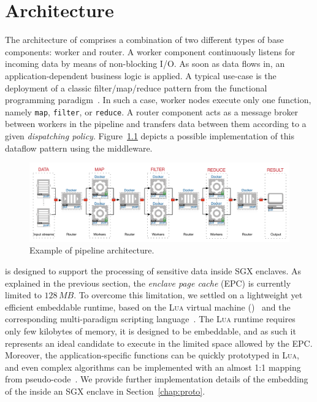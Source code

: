
\chapter{\SS{} Architecture}
\label{chap:arch}

The architecture of \SS{} comprises a combination of two different types of base components: \textsf{worker} and \textsf{router}.
A \textsf{worker} component continuously listens for incoming data by means of non-blocking I/O.
As soon as data flows in, an application-dependent business logic is applied.
A typical use-case is the deployment of a classic filter/map/reduce pattern from the functional programming paradigm~\cite{bird_introduction_1988}.
In such a case, worker nodes execute only one function, namely \texttt{map}, \texttt{filter}, or \texttt{reduce}.
A \textsf{router} component acts as a message broker between workers in the pipeline and transfers data between them according to a given \emph{dispatching policy}.
Figure~\ref{fig:architecture_pipeline} depicts a possible implementation of this dataflow pattern using the \SS{} middleware.

\begin{figure}[t]
  \centering
  \includegraphics[width=\linewidth]{Figures/architecture_pipeline}
  \caption{Example of \SS{} pipeline architecture.}
  \label{fig:architecture_pipeline}
\end{figure}


\SS{} is designed to support the processing of sensitive data inside SGX enclaves.
As explained in the previous section, the \emph{enclave page cache} (EPC) is currently limited to $128\,\mathit{MB}$.
To overcome this limitation, we settled on a lightweight yet efficient embeddable runtime, based on the \textsc{Lua} virtual machine (\luavm)~\cite{ierusalimschy_luaextensible_1996} and the corresponding multi-paradigm scripting language~\cite{lualang}.
The \textsc{Lua} runtime requires only few kilobytes of memory, it is designed to be embeddable, and as such it represents an ideal candidate to execute in the limited space allowed by the EPC.
Moreover, the application-specific functions can be quickly prototyped in \textsc{Lua}, and even complex algorithms can be implemented with an almost 1:1 mapping from pseudo-code~\cite{leonini2009splay}.
We provide further implementation details of the embedding of the \luavm inside an SGX enclave in Section~\ref{chap:proto}.

